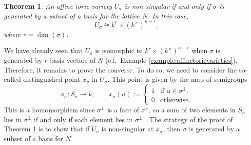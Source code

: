 \documentclass[12pt]{amsart}
\theoremstyle{plain}
\newtheorem{theorem}{Theorem}[subsection]
\begin{document}
\begin{theorem}\label{theorem:singularities}
An affine toric variety $U_\sigma$ is non-singular if and only if $\sigma$ is generated by a subset of a basis for the lattice $N$.
In this case,
$$U_\sigma \cong k^r \times (k^\times)^{n-r},$$
where $r = \dim(\sigma)$.
\end{theorem}

We have already seen that $U_\sigma$ is isomorphic to $k^r \times (k^\times)^{n-r}$ when $\sigma$ is generated by $r$ basis vectors of $N$ (c.f.\ Example \ref{example:affinetoricvarieties}).
Therefore, it remains to prove the converse.
To do so, we need to consider the so-called distinguished point $x_\sigma$ in $U_\sigma$.
This point is given by the map of semigroups
$$x_\sigma : S_\sigma \to k, \qquad x_\sigma(u) := \begin{cases} 1 & \text{if } u \in \sigma^\perp, \\ 0 & \text{otherwise.} \end{cases}$$
This is a homomorphism since $\sigma^\perp$ is a face of $\sigma^\vee$, so a sum of two elements in $S_\sigma$ lies in $\sigma^\perp$ if and only if each element lies in $\sigma^\perp$ \cite[\S 2.1]{Fulton93}.
The strategy of the proof of Theorem \ref{theorem:singularities} is to show that if $U_\sigma$ is non-singular at $x_\sigma$, then $\sigma$ is generated by a subset of a basis for $N$.
\end{document}
